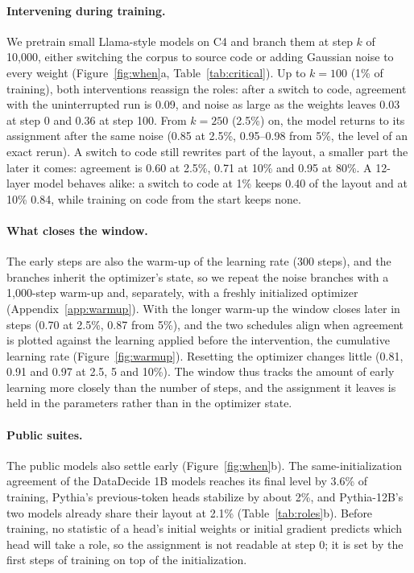 \documentclass[11pt]{article}
\begin{document}
\paragraph{Intervening during training.}
We pretrain small Llama-style models on C4 and branch them at step $k$ of 10{,}000, either switching the corpus to source code or adding Gaussian noise to every weight (Figure~\ref{fig:when}a, Table~\ref{tab:critical}).
Up to $k = 100$ (1\% of training), both interventions reassign the roles: after a switch to code, agreement with the uninterrupted run is 0.09, and noise as large as the weights leaves 0.03 at step 0 and 0.36 at step 100.
From $k = 250$ (2.5\%) on, the model returns to its assignment after the same noise (0.85 at 2.5\%, 0.95--0.98 from 5\%, the level of an exact rerun).
A switch to code still rewrites part of the layout, a smaller part the later it comes: agreement is 0.60 at 2.5\%, 0.71 at 10\% and 0.95 at 80\%.
A 12-layer model behaves alike: a switch to code at 1\% keeps 0.40 of the layout and at 10\% 0.84, while training on code from the start keeps none.

\paragraph{What closes the window.}
The early steps are also the warm-up of the learning rate (300 steps), and the branches inherit the optimizer's state, so we repeat the noise branches with a 1{,}000-step warm-up and, separately, with a freshly initialized optimizer (Appendix~\ref{app:warmup}).
With the longer warm-up the window closes later in steps (0.70 at 2.5\%, 0.87 from 5\%), and the two schedules align when agreement is plotted against the learning applied before the intervention, the cumulative learning rate (Figure~\ref{fig:warmup}).
Resetting the optimizer changes little (0.81, 0.91 and 0.97 at 2.5, 5 and 10\%).
The window thus tracks the amount of early learning more closely than the number of steps, and the assignment it leaves is held in the parameters rather than in the optimizer state.

\paragraph{Public suites.}
The public models also settle early (Figure~\ref{fig:when}b).
The same-initialization agreement of the DataDecide 1B models reaches its final level by 3.6\% of training, Pythia's previous-token heads stabilize by about 2\%, and Pythia-12B's two models already share their layout at 2.1\% (Table~\ref{tab:roles}b).
Before training, no statistic of a head's initial weights or initial gradient predicts which head will take a role, so the assignment is not readable at step 0; it is set by the first steps of training on top of the initialization.
\end{document}
